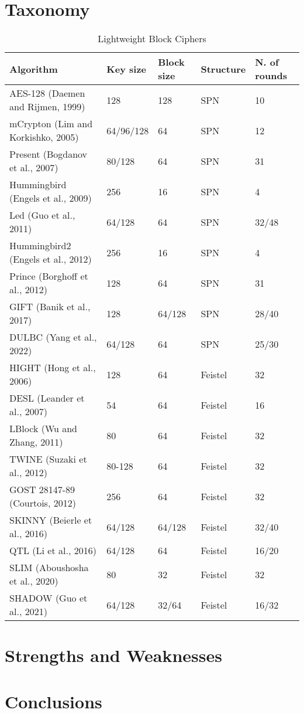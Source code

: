 \documentclass[conference,compsoc]{IEEEtran}
\begin{document}
\section{Taxonomy}
\lipsum[1-5]
\begin{table*}[ht]
    \centering
    \caption{Lightweight Block Ciphers}
    \begin{tabular}{||l l l l l||} 
     \hline
     Algorithm & Key size & Block size & Structure & N. of rounds \\ 
     \hline\hline
     AES-128 (Daemen and Rijmen, 1999)\cite{AES-128}\cite{AES} & 128 & 128 & SPN & 10 \\ 
     \hline
     mCrypton (Lim and Korkishko, 2005)\cite{MCRYPTON} & 64/96/128 & 64 & SPN & 12 \\
     \hline
     Present (Bogdanov et al., 2007)\cite{PRESENT} & 80/128 & 64 & SPN & 31 \\
     \hline
     Hummingbird (Engels et al., 2009)\cite{HUMMINGBIRD} & 256 & 16 & SPN & 4 \\
     \hline
     Led (Guo et al., 2011)\cite{LED} & 64/128 & 64 & SPN & 32/48 \\
     \hline
     Hummingbird2 (Engels et al., 2012)\cite{HUMMINGBIRD2} & 256 & 16 & SPN & 4 \\
     \hline
     Prince (Borghoff et al., 2012)\cite{PRINCE} & 128 & 64 & SPN & 31 \\
     \hline
     GIFT (Banik et al., 2017)\cite{GIFT} & 128 & 64/128 & SPN & 28/40 \\
     \hline
     DULBC (Yang et al., 2022) \cite{DULBC} & 64/128 & 64 & SPN & 25/30 \\
     \hline
     HIGHT (Hong et al., 2006)\cite{HIGHT} & 128 & 64 & Feistel & 32 \\
     \hline
     DESL (Leander et al., 2007)\cite{DESL} & 54 & 64 & Feistel & 16 \\
     \hline
     LBlock (Wu and Zhang, 2011)\cite{LBLOCK} & 80 & 64 & Feistel & 32 \\
     \hline
     TWINE (Suzaki et al., 2012)\cite{TWINE} & 80-128 & 64 & Feistel & 32 \\
     \hline
     GOST 28147-89 (Courtois, 2012)\cite{GOST} & 256 & 64 & Feistel & 32 \\
     \hline
     SKINNY (Beierle et al., 2016)\cite{SKINNY} & 64/128 & 64/128 & Feistel & 32/40 \\
     \hline
     QTL (Li et al., 2016)\cite{QTL} & 64/128 & 64 & Feistel & 16/20 \\
     \hline
     SLIM (Aboushosha et al., 2020)\cite{SLIM} & 80 & 32 & Feistel & 32 \\
     \hline
     SHADOW (Guo et al., 2021)\cite{SHADOW} & 64/128 & 32/64 & Feistel & 16/32 \\
     \hline
    \end{tabular}
\end{table*}
\lipsum[1-5]
\section{Strengths and Weaknesses}
\lipsum[1-5]
\section{Conclusions}
\lipsum[1-5]


\end{document}
